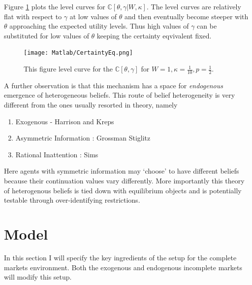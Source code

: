 \documentclass[12pt]{article}
\begin{document}
\noindent Figure \ref{fig:CertaintyEq} plots the level curves for $\mathbb{C}[\theta,\gamma|W,\kappa]$. The level curves are relatively flat with respect to $\gamma$ at low values of $\theta$ and then eventually become steeper with $\theta$ approaching the expected utility levels. Thus  high values of $\gamma$ can be substituted for low values of $\theta$ keeping the certainty eqvivalent fixed. 

\begin{figure}[htbp]
\centering
\texttt{[image: Matlab/CertaintyEq.png]}
\caption{This figure level curve for the $\mathbb{C}[\theta,\gamma]$ for $W=1,\kappa=\frac{1}{10}, p=\frac{1}{2}$.}
\label{fig:CertaintyEq}
\end{figure}




\vspace{10 mm}
\noindent  A further observation is that this mechanism has a space for \emph{endogenous} emergence of heterogeneous beliefs. This route of belief heterogeneity is very different from the ones usually resorted in theory, namely
\begin{enumerate}
	\item Exogenous  - Harrison and Kreps
	\item Asymmetric Information : Grossman Stiglitz
	\item Rational Inattention  : Sims
\end{enumerate}

\noindent Here agents with symmetric information may `choose' to have different beliefs because their continuation values vary differently. More importantly this theory of heterogenous beliefs is tied down with equilibrium objects and is potentially testable through over-identifying restrictions.

\section{Model}
In this section I will specify the key ingredients of the setup for the complete markets environment. Both the exogenous and endogenous incomplete markets will modify this setup.
\end{document}
